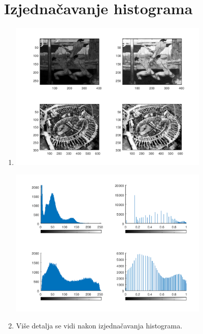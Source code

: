 \documentclass[12pt, a4]{report}
\begin{document}
        \section{Izjednačavanje histograma}
            \begin{enumerate}
                \item
                    \begin{minipage}{\linewidth}
                        \centering
                        \includegraphics[width=0.75\textwidth]{equalized}
                    \end{minipage}
                    \begin{minipage}{\linewidth}
                        \centering
                        \includegraphics[width=0.75\textwidth]{equalized_histograms}
                    \end{minipage}
                \item
                    Više detalja se vidi nakon izjednačavanja histograma.
            \end{enumerate}
\end{document}
